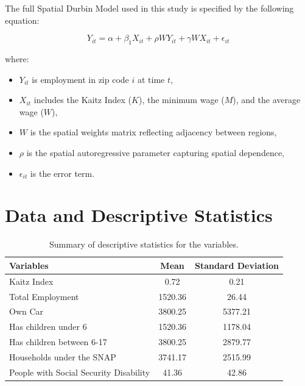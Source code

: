 \documentclass[AEJ]{AEA}
\begin{document}
The full Spatial Durbin Model used in this study is specified by the following equation:

\begin{equation}
	Y_{it} = \alpha + \beta_1 X_{it} + \rho W Y_{it} + \gamma W X_{it} + \epsilon_{it}
\end{equation}

where:
\begin{itemize}
	\item $Y_{it}$ is employment in zip code $i$ at time $t$,
	\item $X_{it}$ includes the Kaitz Index ($K$), the minimum wage ($M$), and the average wage ($W$),
	\item $W$ is the spatial weights matrix reflecting adjacency between regions,
	\item $\rho$ is the spatial autoregressive parameter capturing spatial dependence,
	\item $\epsilon_{it}$ is the error term.
\end{itemize}

\section{Data and Descriptive Statistics}

\begin{table}[ht]
	\centering
	\begin{tabular}{|l|c|c|}
		\hline
		\textbf{Variables}                     & \textbf{Mean} & \textbf{Standard Deviation} \\
		\hline
		Kaitz Index                            & 0.72          & 0.21                        \\
		Total Employment                       & 1520.36       & 26.44                       \\
		Own Car                                & 3800.25       & 5377.21                     \\
		Has children under 6                   & 1520.36       & 1178.04                     \\
		Has children between 6-17              & 3800.25       & 2879.77                     \\
		Households under the SNAP              & 3741.17       & 2515.99                     \\
		People with Social Security Disability & 41.36         & 42.86                       \\
		\hline
	\end{tabular}
	\caption{Summary of descriptive statistics for the variables.}
\end{table}
\end{document}
